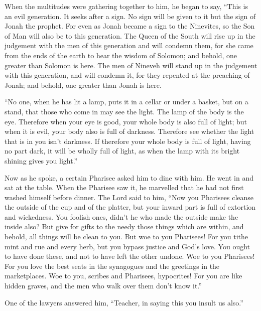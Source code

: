  When the multitudes were gathering together to him, he
began to say, ``This is an evil generation. It seeks after a sign. No
sign will be given to it but the sign of Jonah the prophet.
 For even as Jonah became a sign to the Ninevites, so the
Son of Man will also be to this generation.  The Queen of
the South will rise up in the judgement with the men of this generation
and will condemn them, for she came from the ends of the earth to hear
the wisdom of Solomon; and behold, one greater than Solomon is here.
 The men of Nineveh will stand up in the judgement with
this generation, and will condemn it, for they repented at the preaching
of Jonah; and behold, one greater than Jonah is here.

 ``No one, when he has lit a lamp, puts it in a cellar or
under a basket, but on a stand, that those who come in may see the
light.  The lamp of the body is the eye. Therefore when
your eye is good, your whole body is also full of light; but when it is
evil, your body also is full of darkness.  Therefore see
whether the light that is in you isn't darkness.  If
therefore your whole body is full of light, having no part dark, it will
be wholly full of light, as when the lamp with its bright shining gives
you light.''

 Now as he spoke, a certain Pharisee asked him to dine with
him. He went in and sat at the table.  When the Pharisee
saw it, he marvelled that he had not first washed himself before dinner.
 The Lord said to him, ``Now you Pharisees cleanse the
outside of the cup and of the platter, but your inward part is full of
extortion and wickedness.  You foolish ones, didn't he who
made the outside make the inside also?  But give for gifts
to the needy those things which are within, and behold, all things will
be clean to you.  But woe to you Pharisees! For you tithe
mint and rue and every herb, but you bypass justice and God's love. You
ought to have done these, and not to have left the other undone.
 Woe to you Pharisees! For you love the best seats in the
synagogues and the greetings in the marketplaces.  Woe to
you, scribes and Pharisees, hypocrites! For you are like hidden graves,
and the men who walk over them don't know it.''

 One of the lawyers answered him, ``Teacher, in saying this
you insult us also.''

